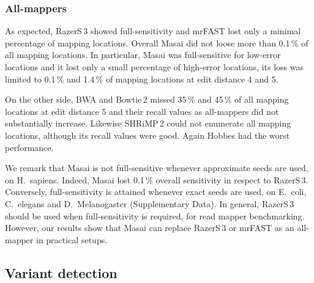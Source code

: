 \subsubsection{All-mappers}
As expected, RazerS\,3 showed full-sensitivity and mrFAST lost only a minimal percentage of mapping locations.
Overall Masai did not loose more than 0.1\,\% of all mapping locations.
In particular, Masai was full-sensitive for low-error locations and it lost only a small percentage of high-error locations, \ie its loss was limited to 0.1\,\% and 1.4\,\% of mapping locations at edit distance 4 and 5.

On the other side, BWA and Bowtie\,2 missed 35\,\% and 45\,\% of all mapping locations at edit distance 5 and their recall values as all-mappers did not substantially increase.
Likewise SHRiMP\,2 could not enumerate all mapping locations, although its recall values were good.
Again Hobbes had the worst performance.

We remark that Masai is not full-sensitive whenever approximate seeds are used, \eg on H.~sapiens. Indeed, Masai lost 0.1\,\% overall sensitivity in respect to RazerS\,3. Conversely, full-sensitivity is attained whenever exact seeds are used, \eg on E.~coli, C.~elegans and D.~Melanogaster (Supplementary Data).
In general, RazerS\,3 should be used when full-sensitivity is required, \ie for read mapper benchmarking. However, our results show that Masai can replace RazerS\,3 or mrFAST as an all-mapper in practical setups.

\begin{table*}[t]
  \caption[Rabema results]
  {
  \label{tab:Rabema}
    {\bfseries Rabema results.}
    Rabema scores in percent
    (average fraction of edit distance locations reported per read).
    Large numbers show total scores in each Rabema category and small numbers show the category scores separately for reads with $\bigl(\begin{smallmatrix}\mbox{\tiny 0}&\mbox{\tiny 1}&\mbox{\tiny 2}\\\mbox{\tiny 3}&\mbox{\tiny 4}&\mbox{\tiny 5}\end{smallmatrix}\bigr)$ errors.
    }
  \vspace{-3mm}
  \center
  \sffamily
  \resizebox{0.95\textwidth}{!}
  {
	\renewcommand{\tabcolsep}{0.8ex}
	
  }
\end{table*}

\subsection{Variant detection}

